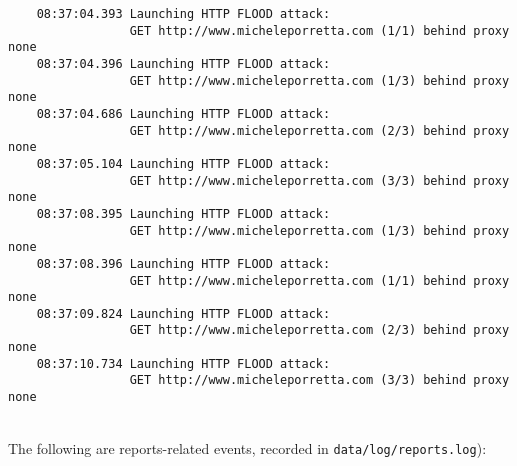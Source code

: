 \begin{verbatim}
    08:37:04.393 Launching HTTP FLOOD attack:
                 GET http://www.micheleporretta.com (1/1) behind proxy none
    08:37:04.396 Launching HTTP FLOOD attack:
                 GET http://www.micheleporretta.com (1/3) behind proxy none
    08:37:04.686 Launching HTTP FLOOD attack:
                 GET http://www.micheleporretta.com (2/3) behind proxy none
    08:37:05.104 Launching HTTP FLOOD attack:
                 GET http://www.micheleporretta.com (3/3) behind proxy none
    08:37:08.395 Launching HTTP FLOOD attack:
                 GET http://www.micheleporretta.com (1/3) behind proxy none
    08:37:08.396 Launching HTTP FLOOD attack:
                 GET http://www.micheleporretta.com (1/1) behind proxy none
    08:37:09.824 Launching HTTP FLOOD attack:
                 GET http://www.micheleporretta.com (2/3) behind proxy none
    08:37:10.734 Launching HTTP FLOOD attack:
                 GET http://www.micheleporretta.com (3/3) behind proxy none
\end{verbatim}
\noindent\\
The following are reports-related events, recorded in \texttt{data/log/reports.log}):


